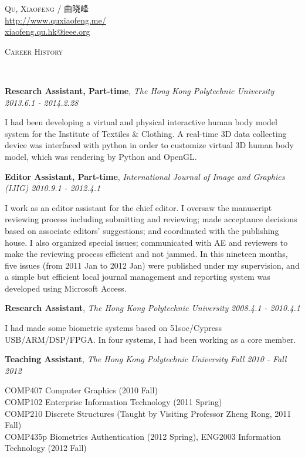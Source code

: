 \documentclass[9pt]{article}
\newenvironment{changemargin}[2]{%
  \begin{list}{}{%
    \setlength{\topsep}{0pt}%
    \setlength{\leftmargin}{#1}%
    \setlength{\rightmargin}{#2}%
    \setlength{\listparindent}{\parindent}%
    \setlength{\itemindent}{\parindent}%
    \setlength{\parsep}{\parskip}%
  }%
  \item[]}{\end{list}
}
\newcommand{\lineover}{
	\begin{changemargin}{-0.05in}{-0.05in}
		\vspace*{-8pt}
		\hrulefill \\
		\vspace*{-2pt}
	\end{changemargin}
}
\newcommand{\header}[1]{
	\begin{changemargin}{-0.5in}{-0.5in}
		\scshape{#1}\\
  	\lineover
	\end{changemargin}
}
\newcommand{\contact}[3]{
	\begin{changemargin}{-0.5in}{-0.5in}
		\begin{center}
			{\Large \scshape {#1}}\\ \smallskip
      {\url{#2}}\\ \smallskip 
      {\href{mailto:#3}{#3}}\\ \smallskip
		\end{center}
	\end{changemargin}
}
\newcommand{\jobtitle}[3]{
	\textbf{#1}, \emph{#2} \hfill \emph{#3}\\
}
\newcommand{\jobdescription}[1]{
	\begin{changemargin}{0.15in}{0.15in}
    \smallskip
		{#1}
    \medskip
	\end{changemargin}
}
\newenvironment{body} {
	\vspace*{-16pt}
	\begin{changemargin}{-0.25in}{-0.5in}
  }	
	{\end{changemargin}
}
\begin{document}
\contact{Qu, Xiaofeng / 曲晓峰}{http://www.quxiaofeng.me/}{xiaofeng.qu.hk@ieee.org}


\header{Career History}

\begin{body}
  \vspace{14pt}

    \jobtitle{Research Assistant, Part-time}{The Hong Kong Polytechnic University}{2013.6.1 - 2014.2.28}
    \jobdescription{
        I had been developing a virtual and physical interactive human body model system for the Institute of Textiles \& Clothing. A real-time 3D data collecting device was interfaced with python in order to customize virtual 3D human body model, which was rendering by Python and OpenGL.
    }

    \jobtitle{Editor Assistant, Part-time}{International Journal of Image and Graphics (IJIG)}{2010.9.1 - 2012.4.1}
    \jobdescription{
        I work as an editor assistant for the chief editor. I oversaw the manuscript reviewing process including submitting and reviewing; made acceptance decisions based on associate editors' suggestions; and coordinated with the publishing house. I also organized special issues; communicated with AE and reviewers to make the reviewing process efficient and not jammed. In this nineteen months, five issues (from 2011 Jan to 2012 Jan) were published under my supervision, and a simple but efficient local journal management and reporting system was developed using Microsoft Access.
    }

	\jobtitle{Research Assistant}{The Hong Kong Polytechnic University}{2008.4.1 - 2010.4.1}
    \jobdescription{
        I had made some biometric systems based on 51soc/Cypress USB/ARM/DSP/FPGA. In four systems, I had been working as a core member.
    }

	\jobtitle{Teaching Assistant}{The Hong Kong Polytechnic University}{Fall 2010 - Fall 2012}
    \jobdescription {
        COMP407 Computer Graphics (2010 Fall)\\
        COMP102 Enterprise Information Technology (2011 Spring)\\
        COMP210 Discrete Structures (Taught by Visiting Professor Zheng Rong, 2011 Fall)\\ COMP435p Biometrics Authentication (2012 Spring), ENG2003 Information Technology (2012 Fall)
    }

\end{body}
\end{document}
